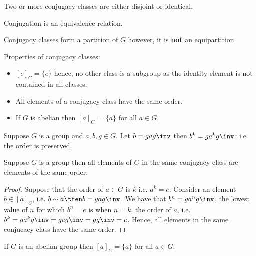 \documentclass[12pt, a4paper]{article}
\begin{document}
\begin{mdprop}
    Two or more conjugacy classes are either disjoint or identical.
\end{mdprop}

\begin{mdremark}
    Conjugation is an equivalence relation.
\end{mdremark}

\begin{theorem}
    Conjugacy classes form a partition of \(G\) however, it is \textbf{not} an equipartition.
\end{theorem}

\begin{proposition}\label{prop: conjugacy properties}
    Properties of conjugacy classes:
    \begin{itemize}
        \item \([e]_C = \{e\}\) hence, no other class is a subgroup as the identity element is not contained in all classes.
        \item All elements of a conjugacy class have the same order.
        \item If \(G\) is abelian then \([a]_C\ = \{a\}\) for all \(a\in G\).
    \end{itemize}
\end{proposition}

\begin{corollary}
    Suppose \(G\) is a group and \(a,b,g \in G\). Let \(b=gag\inv\) then \(b^k=ga^k g\inv\); i.e. the order is preserved.
\end{corollary}

\begin{mdcor}
    Suppose \(G\) is a group then all elements of \(G\) in the same conjugacy class are elements of the same order.
\end{mdcor}

\begin{proof}
    Suppose that the order of \(a \in G\) is \(k\) i.e. \(a^k=e\). Consider an element \(b \in [a]_C\), i.e. \(b \sim a \then b=gag\inv\). We have that \(b^n = ga^n g\inv\), the lowest value of \(n\) for which \(b^n=e\) is when \(n=k\), the order of \(a\), i.e. \(b^k = ga^k g\inv = geg\inv = gg\inv =e\). Hence, all elements in the same conjucacy class have the same order.
\end{proof}

\begin{proposition}
    If \(G\) is an abelian group then \([a]_C =\{a\}\) for all \(a\in G\).
\end{proposition}
\end{document}
